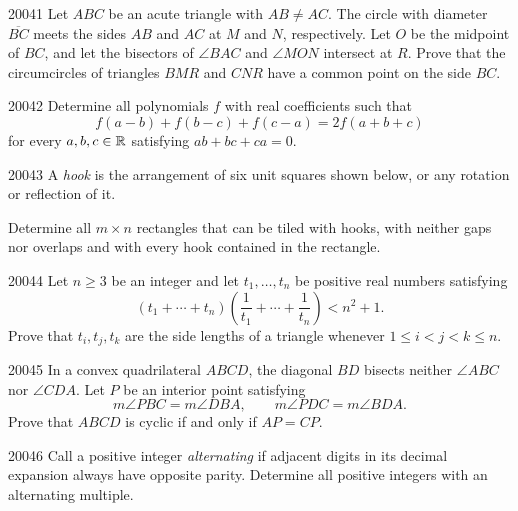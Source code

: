 
\begin{problem}{2004}{1}
Let $ABC$ be an acute triangle with $AB\ne AC$. The circle with diameter $\overline{BC}$ meets the sides $AB$ and $AC$ at $M$ and $N$, respectively. Let $O$ be the midpoint of $BC$, and let the bisectors of $\angle BAC$ and $\angle MON$ intersect at $R$. Prove that the circumcircles of triangles $BMR$ and $CNR$ have a common point on the side $BC$.
\end{problem}

\begin{problem}{2004}{2}
Determine all polynomials $f$ with real coefficients such that
\[
    f(a-b)+f(b-c)+f(c-a)=2f(a+b+c)
\]
for every $a, b, c\in\mathbb{R}$ satisfying $ab+bc+ca=0$.
\end{problem}

\begin{problem}{2004}{3}
A \emph{hook} is the arrangement of six unit squares shown below, or any rotation or reflection of it.



Determine all $m\times n$ rectangles that can be tiled with hooks, with neither gaps nor overlaps and with every hook contained in the rectangle.
\end{problem}

\begin{problem}{2004}{4}
Let $n\geq3$ be an integer and let $t_1, \dots, t_n$ be positive real numbers satisfying
\[
    (t_1+\cdots+t_n)\left(\frac1{t_1}+\cdots+\frac1{t_n}\right)<n^2+1.
\]
Prove that $t_i, t_j, t_k$ are the side lengths of a triangle whenever $1\leq i<j<k\leq n$.
\end{problem}

\begin{problem}{2004}{5}
In a convex quadrilateral $ABCD$, the diagonal $BD$ bisects neither $\angle ABC$ nor $\angle CDA$. Let $P$ be an interior point satisfying
\[
    m\angle PBC=m\angle DBA,\qquad m\angle PDC=m\angle BDA.
\]
Prove that $ABCD$ is cyclic if and only if $AP=CP$.
\end{problem}

\begin{problem}{2004}{6}
Call a positive integer \emph{alternating} if adjacent digits in its decimal expansion always have opposite parity. Determine all positive integers with an alternating multiple.
\end{problem}
